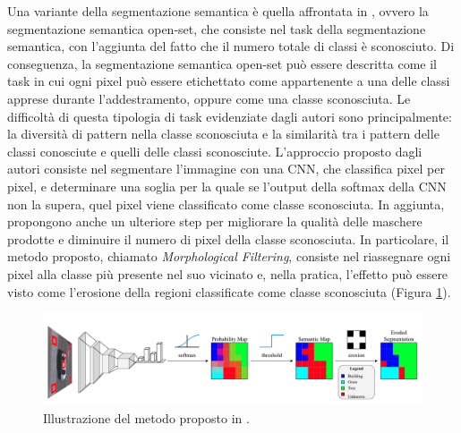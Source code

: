 Una variante della segmentazione semantica è quella affrontata in \cite{towards}, ovvero la segmentazione semantica open-set, che consiste nel task della segmentazione semantica, con l'aggiunta del fatto che il numero totale di classi è sconosciuto. Di conseguenza, la segmentazione semantica open-set può essere descritta come il task in cui ogni pixel può essere etichettato come appartenente a una delle classi apprese durante l'addestramento, oppure come una classe sconosciuta.
Le difficoltà di questa tipologia di task evidenziate dagli autori sono principalmente: la diversità di pattern nella classe sconosciuta e la similarità tra i pattern delle classi conosciute e quelli delle classi sconosciute. L'approccio proposto dagli autori consiste nel segmentare l'immagine con una CNN, che classifica pixel per pixel, e determinare una soglia per la quale se l'output della softmax della CNN non la supera, quel pixel viene classificato come classe sconosciuta. In aggiunta, propongono anche un ulteriore step per migliorare la qualità delle maschere prodotte e diminuire il numero di pixel della classe sconosciuta. In particolare, il metodo proposto, chiamato \textit{Morphological Filtering}, consiste nel riassegnare ogni pixel alla classe più presente nel suo vicinato e, nella pratica, l'effetto può essere visto come l'erosione della regioni classificate come classe sconosciuta (Figura \ref{fig:erosion}).

\begin{figure}[h!]
    \centering
    \hspace*{-0.17in}
    \includegraphics[scale=0.35]{img/erosion.png}
    \caption{Illustrazione del metodo proposto in \cite{towards}.}
    \label{fig:erosion}
\end{figure}





